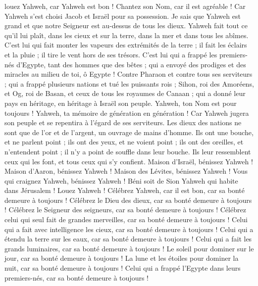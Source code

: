 \begin{multicols}{2}
louez Yahweh, car Yahweh est bon ! Chantez son Nom, car il est agréable !
Car Yahweh s'est choisi Jacob et Israël pour sa possession.
Je sais que Yahweh est grand et que notre Seigneur est au-dessus de tous les dieux.
Yahweh fait tout ce qu'il lui plaît, dans les cieux et sur la terre, dans la mer et dans tous les abîmes.
C'est lui qui fait monter les vapeurs des extrémités de la terre ; il fait les éclairs et la pluie ; il tire le vent hors de ses trésors.
C'est lui qui a frappé les premiers-nés d'Egypte, tant des hommes que des bêtes ;
qui a envoyé des prodiges et des miracles au milieu de toi, ô Egypte ! Contre Pharaon et contre tous ses serviteurs ;
qui a frappé plusieurs nations et tué les puissants rois ;
Sihon, roi des Amoréens, et Og, roi de Basan, et ceux de tous les royaumes de Canaan ;
qui a donné leur pays en héritage, en héritage à Israël son peuple.
Yahweh, ton Nom est pour toujours ! Yahweh, ta mémoire de génération en génération !
Car Yahweh jugera son peuple et se repentira à l'égard de ses serviteurs.
Les dieux des nations ne sont que de l'or et de l'argent, un ouvrage de mains d'homme.
Ils ont une bouche, et ne parlent point ; ils ont des yeux, et ne voient point ;
ils ont des oreilles, et n'entendent point ; il n'y a point de souffle dans leur bouche.
Ils leur ressemblent ceux qui les font, et tous ceux qui s'y confient.
Maison d'Israël, bénissez Yahweh ! Maison d'Aaron, bénissez Yahweh !
Maison des Lévites, bénissez Yahweh ! Vous qui craignez Yahweh, bénissez Yahweh !
Béni soit de Sion Yahweh qui habite dans Jérusalem ! Louez Yahweh !
\VerseOne{}Célébrez Yahweh, car il est bon, car sa bonté demeure à toujours !
Célébrez le Dieu des dieux, car sa bonté demeure à toujours !
Célébrez le Seigneur des seigneurs, car sa bonté demeure à toujours !
Célébrez celui qui seul fait de grandes merveilles, car sa bonté demeure à toujours !
Celui qui a fait avec intelligence les cieux, car sa bonté demeure à toujours !
Celui qui a étendu la terre sur les eaux, car sa bonté demeure à toujours !
Celui qui a fait les grands luminaires, car sa bonté demeure à toujours !
Le soleil pour dominer sur le jour, car sa bonté demeure à toujours !
La lune et les étoiles pour dominer la nuit, car sa bonté demeure à toujours !
Celui qui a frappé l'Egypte dans leurs premiers-nés, car sa bonté demeure à toujours !

\end{multicols}
